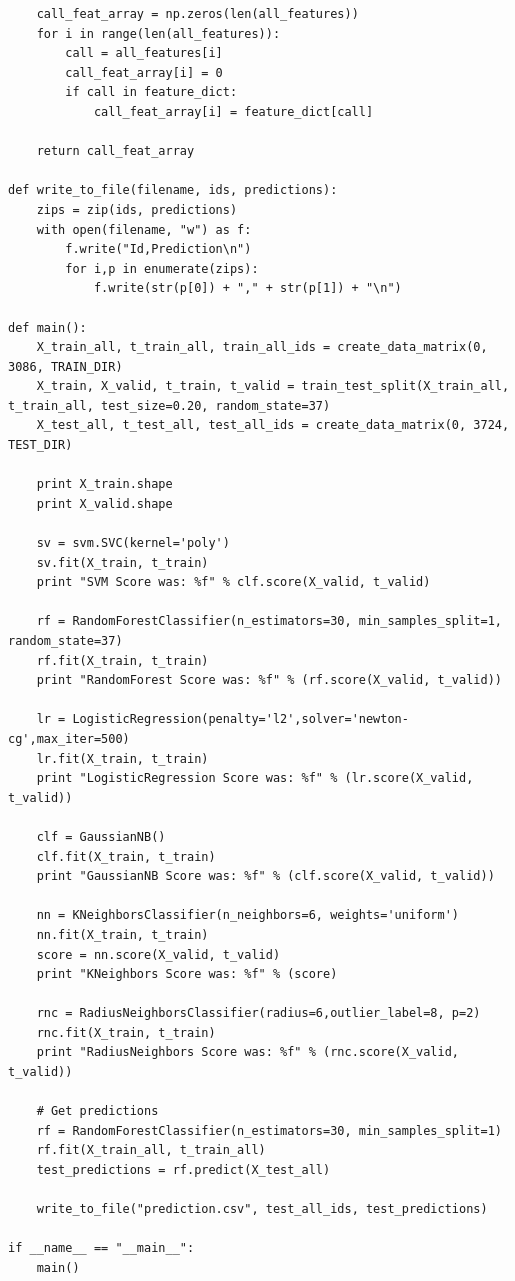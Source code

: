 \documentclass[11pt]{article}
\begin{document}
\begin{lstlisting}
    call_feat_array = np.zeros(len(all_features))
    for i in range(len(all_features)):
        call = all_features[i]
        call_feat_array[i] = 0
        if call in feature_dict:
            call_feat_array[i] = feature_dict[call]

    return call_feat_array

def write_to_file(filename, ids, predictions):
    zips = zip(ids, predictions)
    with open(filename, "w") as f:
        f.write("Id,Prediction\n")
        for i,p in enumerate(zips):
            f.write(str(p[0]) + "," + str(p[1]) + "\n")

def main():
    X_train_all, t_train_all, train_all_ids = create_data_matrix(0, 3086, TRAIN_DIR)
    X_train, X_valid, t_train, t_valid = train_test_split(X_train_all, t_train_all, test_size=0.20, random_state=37)
    X_test_all, t_test_all, test_all_ids = create_data_matrix(0, 3724, TEST_DIR)

    print X_train.shape
    print X_valid.shape
    
    sv = svm.SVC(kernel='poly')
    sv.fit(X_train, t_train)
    print "SVM Score was: %f" % clf.score(X_valid, t_valid)

    rf = RandomForestClassifier(n_estimators=30, min_samples_split=1, random_state=37)
    rf.fit(X_train, t_train)
    print "RandomForest Score was: %f" % (rf.score(X_valid, t_valid))

    lr = LogisticRegression(penalty='l2',solver='newton-cg',max_iter=500)
    lr.fit(X_train, t_train)
    print "LogisticRegression Score was: %f" % (lr.score(X_valid, t_valid))

    clf = GaussianNB()
    clf.fit(X_train, t_train)
    print "GaussianNB Score was: %f" % (clf.score(X_valid, t_valid))

    nn = KNeighborsClassifier(n_neighbors=6, weights='uniform')
    nn.fit(X_train, t_train)
    score = nn.score(X_valid, t_valid)
    print "KNeighbors Score was: %f" % (score)

    rnc = RadiusNeighborsClassifier(radius=6,outlier_label=8, p=2)
    rnc.fit(X_train, t_train)
    print "RadiusNeighbors Score was: %f" % (rnc.score(X_valid, t_valid))

    # Get predictions
    rf = RandomForestClassifier(n_estimators=30, min_samples_split=1)
    rf.fit(X_train_all, t_train_all)
    test_predictions = rf.predict(X_test_all)

    write_to_file("prediction.csv", test_all_ids, test_predictions)

if __name__ == "__main__":
    main()
    
\end{lstlisting}
\end{document}
